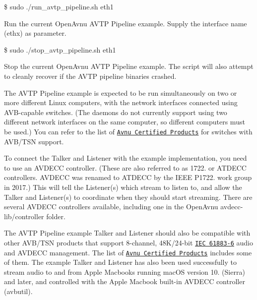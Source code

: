 \begin{DoxyItemize}
\item {\ttfamily \$ sudo ./run\+\_\+avtp\+\_\+pipeline.sh eth1}
\begin{DoxyItemize}
\item Run the current Open\+Avnu A\+V\+TP Pipeline example. Supply the interface name (ethx) as parameter.
\end{DoxyItemize}
\item {\ttfamily \$ sudo ./stop\+\_\+avtp\+\_\+pipeline.sh eth1}
\begin{DoxyItemize}
\item Stop the current Open\+Avnu A\+V\+TP Pipeline example. The script will also attempt to cleanly recover if the A\+V\+TP pipeline binaries crashed.
\end{DoxyItemize}
\end{DoxyItemize}

The A\+V\+TP Pipeline example is expected to be run simultaneously on two or more different Linux computers, with the network interfaces connected using A\+V\+B-\/capable switches. (The daemons do not currently support using two different network interfaces on the same computer, so different computers must be used.) You can refer to the list of \href{http://avnu.org/certified-products/}{\tt Avnu Certified Products} for switches with A\+V\+B/\+T\+SN support.

To connect the Talker and Listener with the example implementation, you need to use an A\+V\+D\+E\+CC controller. (These are also referred to as 1722. or A\+T\+D\+E\+CC controllers. A\+V\+D\+E\+CC was renamed to A\+T\+D\+E\+CC by the I\+E\+EE P1722. work group in 2017.) This will tell the Listener(s) which stream to listen to, and allow the Talker and Listener(s) to coordinate when they should start streaming. There are several A\+V\+D\+E\+CC controllers available, including one in the Open\+Avnu avdecc-\/lib/controller folder.

The A\+V\+TP Pipeline example Talker and Listener should also be compatible with other A\+V\+B/\+T\+SN products that support 8-\/channel, 48\+K/24-\/bit \href{https://webstore.iec.ch/preview/info_iec61883-6%7Bed2.0%7Den.pdf}{\tt I\+EC 61883-\/6} audio and A\+V\+D\+E\+CC management. The list of \href{http://avnu.org/certified-products/}{\tt Avnu Certified Products} includes some of them. The example Talker and Listener has also been used successfully to stream audio to and from Apple Macbooks running mac\+OS version 10.\+12 (Sierra) and later, and controlled with the Apple Macbook built-\/in A\+V\+D\+E\+CC controller (avbutil).


